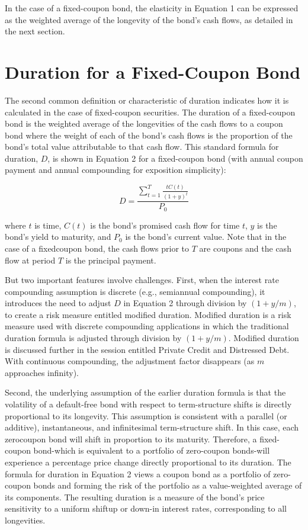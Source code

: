 \documentclass[11pt]{article}
\begin{document}
In the case of a fixed-coupon bond, the elasticity in Equation 1 can be expressed as the weighted average of the longevity of the bond's cash flows, as detailed in the next section.

\section*{Duration for a Fixed-Coupon Bond}
The second common definition or characteristic of duration indicates how it is calculated in the case of fixed-coupon securities. The duration of a fixed-coupon bond is the weighted average of the longevities of the cash flows to a coupon bond where the weight of each of the bond's cash flows is the proportion of the bond's total value attributable to that cash flow. This standard formula for duration, $D$, is shown in Equation 2 for a fixed-coupon bond (with annual coupon payment and annual compounding for exposition simplicity):


\begin{equation*}
D=\frac{\sum_{t=1}^{T} \frac{t C(t)}{(1+y)^{t}}}{P_{0}} \tag{2}
\end{equation*}


where $t$ is time, $C(t)$ is the bond's promised cash flow for time $t$, $y$ is the bond's yield to maturity, and $P_{0}$ is the bond's current value. Note that in the case of a fixedcoupon bond, the cash flows prior to $T$ are coupons and the cash flow at period $T$ is the principal payment.

But two important features involve challenges. First, when the interest rate compounding assumption is discrete (e.g., semiannual compounding), it introduces the need to adjust $D$ in Equation 2 through division by $(1+y / m)$, to create a risk measure entitled modified duration. Modified duration is a risk measure used with discrete compounding applications in which the traditional duration formula is adjusted through division by $(1+y / m)$. Modified duration is discussed further in the session entitled Private Credit and Distressed Debt. With continuous compounding, the adjustment factor disappears (as $m$ approaches infinity).

Second, the underlying assumption of the earlier duration formula is that the volatility of a default-free bond with respect to term-structure shifts is directly proportional to its longevity. This assumption is consistent with a parallel (or additive), instantaneous, and infinitesimal term-structure shift. In this case, each zerocoupon bond will shift in proportion to its maturity. Therefore, a fixed-coupon bond-which is equivalent to a portfolio of zero-coupon bonds-will experience a percentage price change directly proportional to its duration. The formula for duration in Equation 2 views a coupon bond as a portfolio of zero-coupon bonds and forming the risk of the portfolio as a value-weighted average of its components. The resulting duration is a measure of the bond's price sensitivity to a uniform shiftup or down-in interest rates, corresponding to all longevities.
\end{document}
